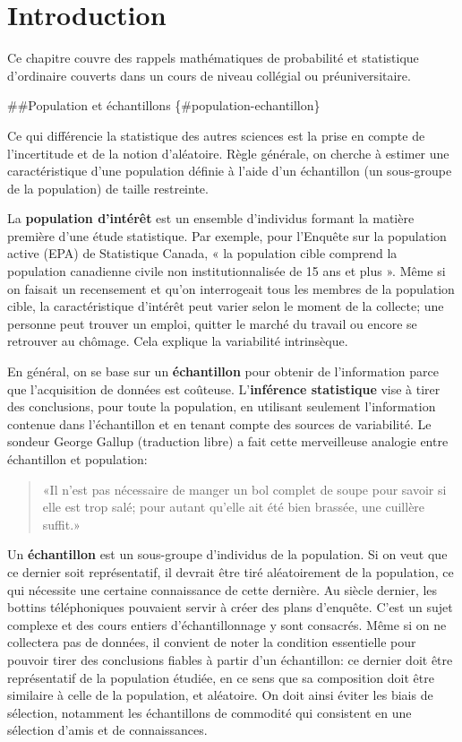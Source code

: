 \documentclass[
  11pt,
  letterpaper,
]{scrbook}
\theoremstyle{definition}
\theoremstyle{definition}
\theoremstyle{remark}
\begin{document}

\chapter{Introduction}\label{intro}

Ce chapitre couvre des rappels mathématiques de probabilité et
statistique d'ordinaire couverts dans un cours de niveau collégial ou
préuniversitaire.

\#\#Population et échantillons \{\#population-echantillon\}

Ce qui différencie la statistique des autres sciences est la prise en
compte de l'incertitude et de la notion d'aléatoire. Règle générale, on
cherche à estimer une caractéristique d'une population définie à l'aide
d'un échantillon (un sous-groupe de la population) de taille restreinte.

La \textbf{population d'intérêt} est un ensemble d'individus formant la
matière première d'une étude statistique. Par exemple, pour l'Enquête
sur la population active (EPA) de Statistique Canada, « la population
cible comprend la population canadienne civile non institutionnalisée de
15 ans et plus ». Même si on faisait un recensement et qu'on
interrogeait tous les membres de la population cible, la caractéristique
d'intérêt peut varier selon le moment de la collecte; une personne peut
trouver un emploi, quitter le marché du travail ou encore se retrouver
au chômage. Cela explique la variabilité intrinsèque.

En général, on se base sur un \textbf{échantillon} pour obtenir de
l'information parce que l'acquisition de données est coûteuse.
L'\textbf{inférence statistique} vise à tirer des conclusions, pour
toute la population, en utilisant seulement l'information contenue dans
l'échantillon et en tenant compte des sources de variabilité. Le sondeur
George Gallup (traduction libre) a fait cette merveilleuse analogie
entre échantillon et population:

\begin{quote}
«Il n'est pas nécessaire de manger un bol complet de soupe pour savoir
si elle est trop salé; pour autant qu'elle ait été bien brassée, une
cuillère suffit.»
\end{quote}

Un \textbf{échantillon} est un sous-groupe d'individus de la population.
Si on veut que ce dernier soit représentatif, il devrait être tiré
aléatoirement de la population, ce qui nécessite une certaine
connaissance de cette dernière. Au siècle dernier, les bottins
téléphoniques pouvaient servir à créer des plans d'enquête. C'est un
sujet complexe et des cours entiers d'échantillonnage y sont consacrés.
Même si on ne collectera pas de données, il convient de noter la
condition essentielle pour pouvoir tirer des conclusions fiables à
partir d'un échantillon: ce dernier doit être représentatif de la
population étudiée, en ce sens que sa composition doit être similaire à
celle de la population, et aléatoire. On doit ainsi éviter les biais de
sélection, notamment les échantillons de commodité qui consistent en une
sélection d'amis et de connaissances.
\end{document}
